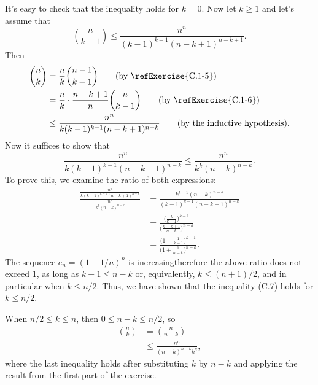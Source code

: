It's easy to check that the inequality holds for $k=0$.
Now let $k\ge1$ and let's assume that
\[
    \binom{n}{k-1} \le \frac{n^n}{(k-1)^{k-1}(n-k+1)^{n-k+1}}.
\]
Then
\begin{align*}
    \binom{n}{k} &= \frac{n}{k}\binom{n-1}{k-1} \tag{by \refExercise{C.1-5}} \\
    &= \frac{n}{k}\cdot\frac{n-k+1}{n}\binom{n}{k-1} \tag{by \refExercise{C.1-6}} \\
    &\le \frac{n^n}{k(k-1)^{k-1}(n-k+1)^{n-k}} \tag{by the inductive hypothesis}.
\end{align*}
Now it suffices to show that
\[
    \frac{n^n}{k(k-1)^{k-1}(n-k+1)^{n-k}} \le \frac{n^n}{k^k(n-k)^{n-k}}.
\]
To prove this, we examine the ratio of both expressions:
\begin{align*}
    \frac{\frac{n^n}{k(k-1)^{k-1}(n-k+1)^{n-k}}}{\frac{n^n}{k^k(n-k)^{n-k}}} &= \frac{k^{k-1}(n-k)^{n-k}}{(k-1)^{k-1}(n-k+1)^{n-k}} \\
    &= \frac{\bigl(\frac{k}{k-1}\bigr)^{k-1}}{\bigl(\frac{n-k+1}{n-k}\bigr)^{n-k}} \\[1mm]
    &= \frac{\bigl(1+\frac{1}{k-1}\bigr)^{k-1}}{\bigl(1+\frac{1}{n-k}\bigr)^{n-k}}.
\end{align*}
The sequence $e_n={(1+1/n)}^n$ is increasing\dash therefore the above ratio does not exceed 1, as long as $k-1\le n-k$ or, equivalently, $k\le(n+1)/2$, and in particular when $k\le n/2$.
Thus, we have shown that the inequality (C.7) holds for $k\le n/2$.

When $n/2\le k\le n$, then $0\le n-k\le n/2$, so
\begin{align*}
    \binom{n}{k} &= \binom{n}{n-k} \tag{by equation (C.3)} \\
    &\le \frac{n^n}{(n-k)^{n-k}k^k},
\end{align*}
where the last inequality holds after substituting $k$ by $n-k$ and applying the result from the first part of the exercise.
